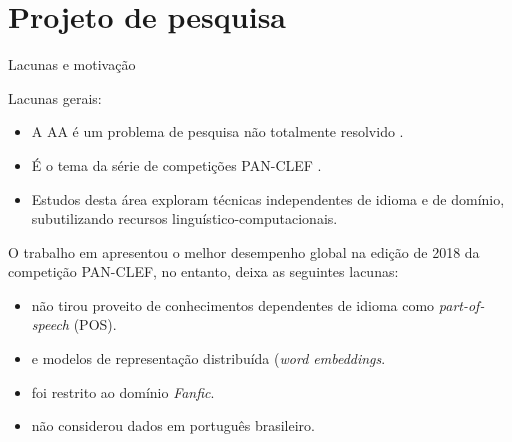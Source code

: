 \section{Projeto de pesquisa}



\begin{frame}{Lacunas e motivação}

Lacunas gerais:

\begin{itemize}
	\item A AA é um problema de pesquisa não totalmente resolvido \cite{Potthast2017}.
	\item É o tema da série de competições PAN-CLEF \cite{aa-overview-2018} \cite{Kocher2017Verificacao,Koppel2018_pseud,Varela2016}.
	\item Estudos desta área exploram técnicas independentes de idioma e de domínio, subutilizando  recursos linguístico-computacionais.
\end{itemize}

O trabalho em  apresentou o melhor desempenho global na edição de 2018 da competição PAN-CLEF, no entanto, deixa as seguintes lacunas:
\begin{itemize}
	\item não tirou proveito de conhecimentos dependentes de idioma como {\it part-of-speech} (POS).
	\item e modelos de representação distribuída ({\it word embeddings}.
	\item foi restrito ao domínio {\it Fanfic}.
	\item não considerou dados em português brasileiro.
\end{itemize}

\end{frame}


